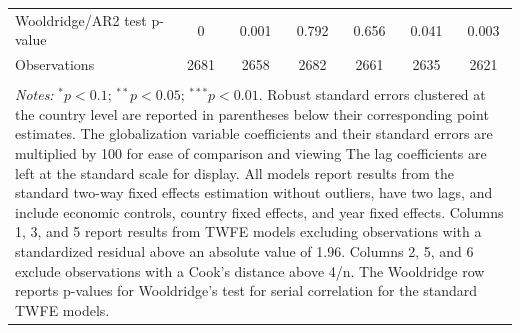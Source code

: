 \begin{table}[!htbp]
\begin{tabular}{@{\extracolsep{2pt}}lcccccc}
Wooldridge/AR2 test p-value & 0 & 0.001 & 0.792 & 0.656 & 0.041 & 0.003 \\ 
Observations & 2681 & 2658 & 2682 & 2661 & 2635 & 2621 \\ 
\hline 
\hline \\[-1.8ex] 
\multicolumn{7}{l}{\parbox{1.2\linewidth}{\textit{Notes:} $^{*}p<0.1$; $^{**}
            p<0.05$; $^{***} p<0.01$. Robust standard errors clustered at the
            country level are reported in parentheses below their corresponding
            point estimates. The globalization variable coefficients and their
            standard errors are multiplied by 100 for ease of comparison and
            viewing The lag coefficients are left at the standard scale for
            display. All models report results from the standard
            two-way fixed effects estimation without outliers, have two lags, and include economic controls, country fixed
            effects, and year fixed effects. Columns 1, 3, and 5 report results from TWFE models excluding observations with a standardized residual above an absolute value of 1.96. Columns 2, 5, and 6 exclude observations with a Cook's distance above 4/n. The Wooldridge row reports
            p-values for Wooldridge's test for serial correlation for the
            standard TWFE models.}} \\ 
\end{tabular} 
\end{table} 
